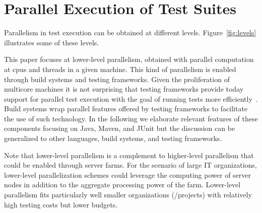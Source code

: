 \section{Parallel Execution of Test Suites}

  Parallelism in test execution can be obtained at different
levels.  Figure~\ref{fig:levels} illustrates some of these levels.

This paper focuses at lower-level parallelism, obtained with parallel
computation at cpus and threads in a given machine.  This kind of
parallelism is enabled through build systems and testing frameworks.
Given the proliferation of multicore machines it is not surprising
that testing frameworks provide today support for parallel test
execution with the goal of running tests more
efficiently~\cite{junit-org,testng,nunit}.  Build systems wrap
parallel features offered by testing frameworks to facilitate the use
of such technology\cite{maven-surefire-plugin}.  In the following we
elaborate relevant features of these components focusing on Java,
Maven, and JUnit but the discussion can be generalized to other
languages, build systems, and testing frameworks.

Note that lower-level parallelism is a complement to higher-level
parallelism that could be enabled through server farms.  For the
scenario of large IT organizations, lower-level parallelization
schemes could leverage the computing power of server nodes in addition
to the aggregate processing power of the farm.  Lower-level
parallelism fits particularly well smaller organizations (/projects)
with relatively high testing costs but lower budgets.


